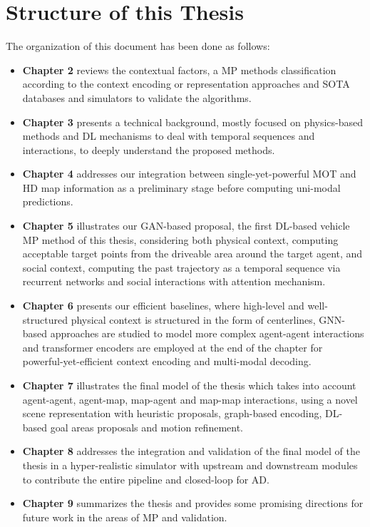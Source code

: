 \section{Structure of this Thesis}
\label{sec:1_structure}

The organization of this document has been done as follows:

\begin{itemize}
	
	\item \textbf{Chapter 2} reviews the contextual factors, a \ac{MP} methods classification according to the context encoding or representation approaches and \ac{SOTA} databases and simulators to validate the algorithms. 
	
	\item \textbf{Chapter 3} presents a technical background, mostly focused on physics-based methods and \ac{DL} mechanisms to deal with temporal sequences and interactions, to deeply understand the proposed methods.
	
	\item \textbf{Chapter 4} addresses our integration between single-yet-powerful \ac{MOT} and HD map information as a preliminary stage before computing uni-modal predictions.
	
	\item \textbf{Chapter 5} illustrates our \ac{GAN}-based proposal, the first \ac{DL}-based vehicle \ac{MP} method of this thesis, considering both physical context, computing acceptable target points from the driveable area around the target agent, and social context, computing the past trajectory as a temporal sequence via recurrent networks and social interactions with attention mechanism.
	
	\item \textbf{Chapter 6} presents our efficient baselines, where high-level and well-structured physical context is structured in the form of centerlines, \ac{GNN}-based approaches are studied to model more complex agent-agent interactions and transformer encoders are employed at the end of the chapter for powerful-yet-efficient context encoding and multi-modal decoding.
	
	\item \textbf{Chapter 7} illustrates the final model of the thesis which takes into account agent-agent, agent-map, map-agent and map-map interactions, using a novel scene representation with heuristic proposals, graph-based encoding, \ac{DL}-based goal areas proposals and motion refinement.
	
	\item \textbf{Chapter 8} addresses the integration and validation of the final model of the thesis in a hyper-realistic simulator with upstream and downstream modules to contribute the entire pipeline and closed-loop for \ac{AD}.
	
	\item \textbf{Chapter 9} summarizes the thesis and provides some promising directions for future work in the areas of \ac{MP} and validation.
	
\end{itemize}
